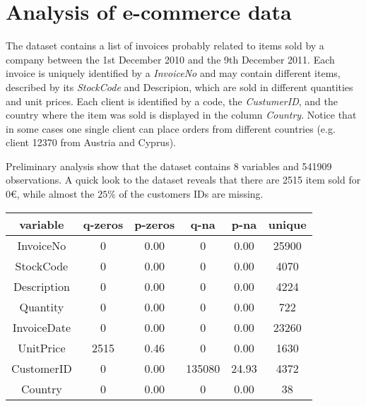 \documentclass[12pt,a4paper,oneside,italian]{book}\usepackage{knitr}
\begin{document}
\chapter*{Analysis of e-commerce data}











The dataset contains a list of invoices probably related to items sold by a company between the 1st December 2010 and the 9th December 2011.
Each invoice is uniquely identified by a \textit{InvoiceNo} and may contain different items, described by its \textit{StockCode} and Descripion, which are sold in different quantities and unit prices. Each client is identified by a code, the \textit{CustumerID}, and the country where the item was sold is displayed in the column \textit{Country}. Notice that in some cases one single client can place orders from different countries (e.g. client 12370 from Austria and Cyprus).




Preliminary analysis show that the dataset contains 8 variables and 541909 observations. A quick look to the dataset reveals that there are 2515 item sold for 0€, while almost the $25\%$ of the customers IDs are missing.

\begin{table}[!h]
\centering
\begin{tabular}{cccccc}
\toprule
variable & q-zeros & p-zeros & q-na & p-na & unique\\
\midrule
InvoiceNo & 0 & 0.00 & 0 & 0.00 & 25900\\
StockCode & 0 & 0.00 & 0 & 0.00 & 4070\\
Description & 0 & 0.00 & 0 & 0.00 & 4224\\
Quantity & 0 & 0.00 & 0 & 0.00 & 722\\
InvoiceDate & 0 & 0.00 & 0 & 0.00 & 23260\\
UnitPrice & 2515 & 0.46 & 0 & 0.00 & 1630\\
CustomerID & 0 & 0.00 & 135080 & 24.93 & 4372\\
Country & 0 & 0.00 & 0 & 0.00 & 38\\
\bottomrule
\end{tabular}
\end{table}
\end{document}
